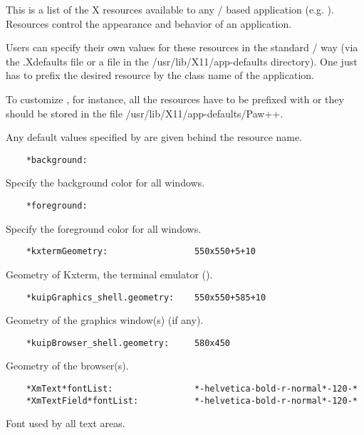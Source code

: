    This is a list of the X resources available to any \KUIP/\MOTIF{} based
   application (e.g. \PAWPP).  Resources control the appearance and behavior of
   an application.

   Users can specify their own values for these resources in the standard
   \Xxi/\MOTIF{} way (via the .Xdefaults file or a file in the
   /usr/lib/X11/app-defaults directory). One just has to prefix the desired
   resource by the class name of the application.

   To customize \PAWPP, for instance, all the resources have to be prefixed
   with  or they should be stored in the file
   /usr/lib/X11/app-defaults/Paw++.

   Any default values specified by \KUIP{} are given behind the resource name.

\begin{verbatim}
    *background:
\end{verbatim}

   Specify the background color for all windows.

\begin{verbatim}
    *foreground:
\end{verbatim}

   Specify the foreground color for all windows.

\begin{verbatim}
    *kxtermGeometry:                 550x550+5+10
\end{verbatim}

   Geometry of Kxterm, the \KUIP{} terminal emulator (\EW).

\begin{verbatim}
    *kuipGraphics_shell.geometry:    550x550+585+10
\end{verbatim}

   Geometry of the graphics window(s) (if any).

\begin{verbatim}
    *kuipBrowser_shell.geometry:     580x450
\end{verbatim}

   Geometry of the browser(s).

\begin{verbatim}
    *XmText*fontList:                *-helvetica-bold-r-normal*-120-*
    *XmTextField*fontList:           *-helvetica-bold-r-normal*-120-*
\end{verbatim}

   Font used by all text areas.

